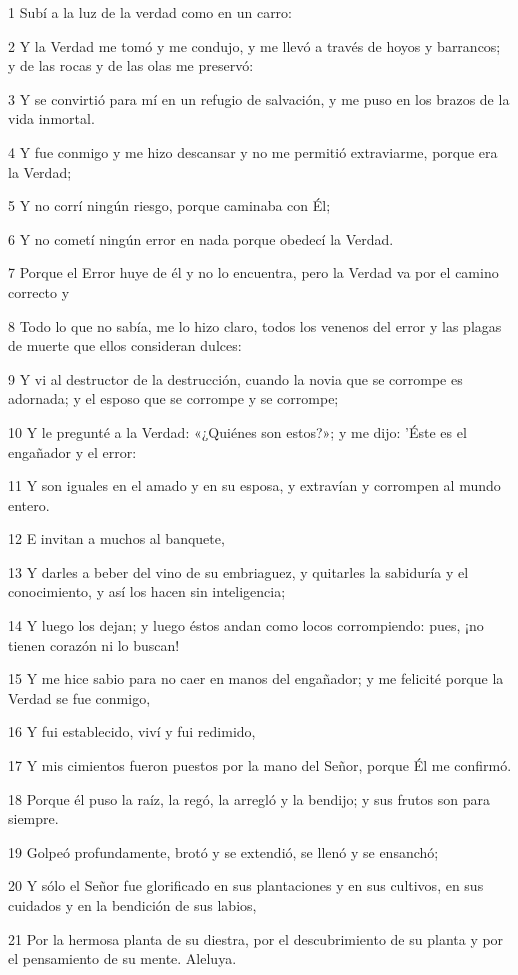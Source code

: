 \par 1 Subí a la luz de la verdad como en un carro:
\par 2 Y la Verdad me tomó y me condujo, y me llevó a través de hoyos y barrancos; y de las rocas y de las olas me preservó:
\par 3 Y se convirtió para mí en un refugio de salvación, y me puso en los brazos de la vida inmortal.
\par 4 Y fue conmigo y me hizo descansar y no me permitió extraviarme, porque era la Verdad;
\par 5 Y no corrí ningún riesgo, porque caminaba con Él;
\par 6 Y no cometí ningún error en nada porque obedecí la Verdad.
\par 7 Porque el Error huye de él y no lo encuentra, pero la Verdad va por el camino correcto y
\par 8 Todo lo que no sabía, me lo hizo claro, todos los venenos del error y las plagas de muerte que ellos consideran dulces:
\par 9 Y vi al destructor de la destrucción, cuando la novia que se corrompe es adornada; y el esposo que se corrompe y se corrompe;
\par 10 Y le pregunté a la Verdad: «¿Quiénes son estos?»; y me dijo: 'Éste es el engañador y el error:
\par 11 Y son iguales en el amado y en su esposa, y extravían y corrompen al mundo entero.
\par 12 E invitan a muchos al banquete,
\par 13 Y darles a beber del vino de su embriaguez, y quitarles la sabiduría y el conocimiento, y así los hacen sin inteligencia;
\par 14 Y luego los dejan; y luego éstos andan como locos corrompiendo: pues, ¡no tienen corazón ni lo buscan!
\par 15 Y me hice sabio para no caer en manos del engañador; y me felicité porque la Verdad se fue conmigo,
\par 16 Y fui establecido, viví y fui redimido,
\par 17 Y mis cimientos fueron puestos por la mano del Señor, porque Él me confirmó.
\par 18 Porque él puso la raíz, la regó, la arregló y la bendijo; y sus frutos son para siempre.
\par 19 Golpeó profundamente, brotó y se extendió, se llenó y se ensanchó;
\par 20 Y sólo el Señor fue glorificado en sus plantaciones y en sus cultivos, en sus cuidados y en la bendición de sus labios,
\par 21 Por la hermosa planta de su diestra, por el descubrimiento de su planta y por el pensamiento de su mente. Aleluya.

